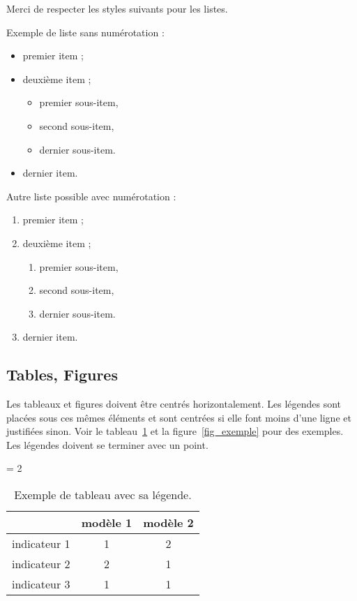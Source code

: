 \documentclass[a4paper,pagenum,french,showlayout]{rnti}
\begin{document}
Merci de respecter les styles suivants pour les listes.

Exemple de liste sans numérotation :
\begin{itemize}
    \item premier item ;
    \item deuxième item ;
    \begin{itemize}
      \item premier sous-item,
      \item second sous-item,
      \item dernier sous-item.
  \end{itemize}
  \item dernier item.
\end{itemize}

Autre liste possible avec numérotation :
\begin{enumerate}
    \item premier item ;
    \item deuxième item ;
    \begin{enumerate}
      \item premier sous-item,
      \item second sous-item,
      \item dernier sous-item.
    \end{enumerate}
  \item dernier item.
\end{enumerate}

\subsection{Tables, Figures}


Les tableaux et figures doivent être centrés horizontalement. Les
légendes sont placées sous ces mêmes éléments et sont centrées si
elle font moins d'une ligne et justifiées sinon. Voir le
tableau~\ref{tab_exemple} et la figure~\ref{fig_exemple} pour des
exemples. Les légendes doivent se terminer avec un point.



\begin{table}[ht]
 \begin{center}
   \tabcolsep = 2\tabcolsep
   \begin{tabular}{lcc}
   \hline\hline
                & modèle 1 & modèle 2 \\
   \hline
   indicateur 1 & 1        & 2        \\
   indicateur 2 & 2        & 1        \\
   indicateur 3 & 1        & 1        \\
   \hline
   \end{tabular}
\caption{Exemple de tableau avec sa légende.} \label{tab_exemple}
 \end{center}
\end{table}
\end{document}
